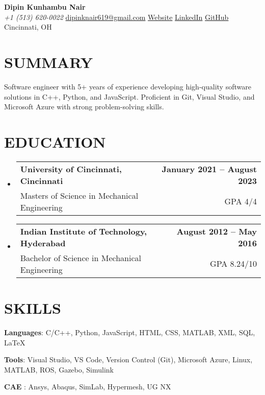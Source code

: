 \documentclass[letterpaper,11pt]{article}
\makeatletter
\newcommand{\resumeSubheading}[4]{
  \vspace{-2pt}\item
    \begin{tabular*}{1.0\textwidth}[t]{l@{\extracolsep{\fill}}r}
      \textbf{{#1}} & \textbf{{\small #2}} \\
      
      {#3} & {\small #4} \\
    \end{tabular*}\vspace{-4pt}
}
\newcommand{\resumeSubHeadingListStart}{\begin{itemize}[leftmargin=0.0in, label={}]}
\newcommand{\resumeSubHeadingListEnd}{\end{itemize}}
\makeatother
\begin{document}
\begin{center}
  {\huge \textbf{Dipin Kunhambu Nair}} \\
  \small \emph{+1 (513) 620-0022} \textbullet \href{mailto:dipinknair619@gmail.com}{dipinknair619@gmail.com} \textbullet
  \textbullet
   \href{https://dipinknair.github.io/}{Website}
  \href{https://linkedin.com/in/dipinknair619/}{LinkedIn} 
  \textbullet
  \href{https://github.com/dipinknair}{GitHub} 
  \textbullet
  Cincinnati, OH \\
  \vspace{-10pt}
\end{center}

\vspace{-20pt}
\section{SUMMARY}
{Software engineer with 5+ years of experience developing high-quality software solutions in C++, Python, and JavaScript. Proficient in Git, Visual Studio, and Microsoft Azure with strong problem-solving skills.}
\vspace{-10pt}
\section{EDUCATION}
  \resumeSubHeadingListStart
    \resumeSubheading
      {University of Cincinnati, Cincinnati}{January 2021 -- August 2023}
      {Masters of Science in Mechanical Engineering}{GPA 4/4}
  \resumeSubHeadingListEnd
  \vspace{-15pt}
  \resumeSubHeadingListStart
    \resumeSubheading
      {Indian Institute of Technology, Hyderabad}{August 2012 -- May 2016}
      {Bachelor of Science in Mechanical Engineering}{GPA 8.24/10}
  \resumeSubHeadingListEnd
\vspace{-15pt}

\section{SKILLS}
 \begin{itemize}[leftmargin=0.2in]
    \small{\item{
     \textbf{Languages}{: C/C++, Python, JavaScript, HTML, CSS, MATLAB, XML, SQL, \LaTeX }
     \vspace{-5pt}
     \item{\textbf{Tools}{: Visual Studio, VS Code, Version Control (Git), Microsoft Azure, Linux, MATLAB, ROS, Gazebo, Simulink}}
     \vspace{-5pt}
     \item{\textbf{CAE  }{: Ansys, Abaqus, SimLab, Hypermesh, UG NX}}
    }}
 \end{itemize}
 \vspace{-18pt}
\end{document}
